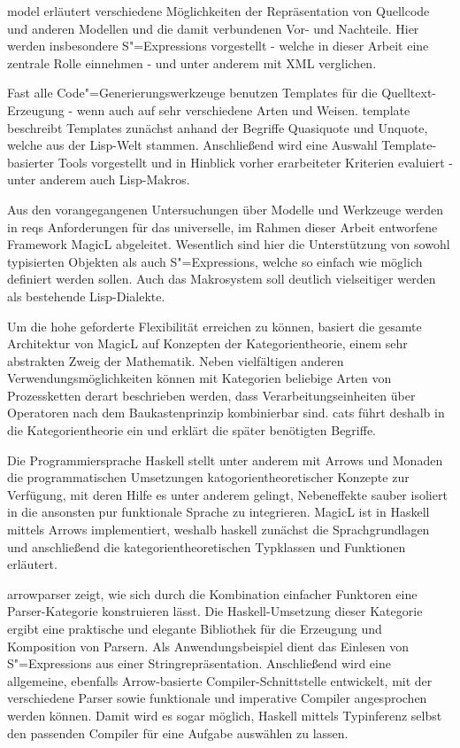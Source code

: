 \documentclass[11pt, a4paper, bibgerm]{book}
\newcommand\cref{}
\newcommand{\sexps}{S"=Expressions}
\newcommand{\cgen}{Code"=Generierung}
\begin{document}
\cref{model} erläutert verschiedene Möglichkeiten der Repräsentation von
Quellcode und anderen Modellen und die damit verbundenen Vor- und
Nachteile. Hier werden insbesondere \sexps{} vorgestellt - welche in
dieser Arbeit eine zentrale Rolle einnehmen - und unter anderem mit XML
verglichen.

Fast alle \cgen{}swerkzeuge benutzen Templates für die
Quelltext-Erzeugung - wenn auch auf sehr verschiedene Arten und
Weisen. \cref{template} beschreibt Templates zunächst anhand der
Begriffe Quasiquote und Unquote, welche aus der Lisp-Welt
stammen. Anschließend wird eine Auswahl Template-basierter Tools
vorgestellt und in Hinblick vorher erarbeiteter Kriterien evaluiert -
unter anderem auch Lisp-Makros.

Aus den vorangegangenen Untersuchungen über Modelle und Werkzeuge werden
in \cref{reqs} Anforderungen für das universelle, im Rahmen dieser
Arbeit entworfene Framework MagicL abgeleitet. Wesentlich sind hier die
Unterstützung von sowohl typisierten Objekten als auch \sexps{}, welche
so einfach wie möglich definiert werden sollen. Auch das Makrosystem
soll deutlich vielseitiger werden als bestehende Lisp-Dialekte.

Um die hohe geforderte Flexibilität erreichen zu können, basiert die
gesamte Architektur von MagicL auf Konzepten der Kategorientheorie,
einem sehr abstrakten Zweig der Mathematik. Neben vielfältigen anderen
Verwendungsmöglichkeiten können mit Kategorien beliebige Arten von
Prozessketten derart beschrieben werden, dass Verarbeitungseinheiten
über Operatoren nach dem Baukastenprinzip kombinierbar sind. \cref{cats}
führt deshalb in die Kategorientheorie ein und erklärt die später
benötigten Begriffe.

Die Programmiersprache Haskell stellt unter anderem mit Arrows und
Monaden die programmatischen Umsetzungen katogorientheoretischer
Konzepte zur Verfügung, mit deren Hilfe es unter anderem gelingt,
Nebeneffekte sauber isoliert in die ansonsten pur funktionale Sprache zu
integrieren. MagicL ist in Haskell mittels Arrows implementiert, weshalb
\cref{haskell} zunächst die Sprachgrundlagen und anschließend die
kategorientheoretischen Typklassen und Funktionen erläutert.

\cref{arrowparser} zeigt, wie sich durch die Kombination einfacher
Funktoren eine Parser-Kategorie konstruieren lässt. Die
Haskell-Umsetzung dieser Kategorie ergibt eine praktische und elegante
Bibliothek für die Erzeugung und Komposition von Parsern. Als
Anwendungsbeispiel dient das Einlesen von \sexps{} aus einer
Stringrepräsentation. Anschließend wird eine allgemeine, ebenfalls
Arrow-basierte Compiler-Schnittstelle entwickelt, mit der verschiedene
Parser sowie funktionale und imperative Compiler angesprochen werden
können. Damit wird es sogar möglich, Haskell mittels Typinferenz selbst
den passenden Compiler für eine Aufgabe auswählen zu lassen.
\end{document}
